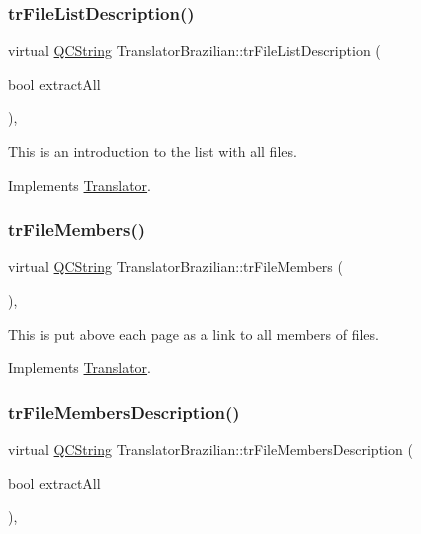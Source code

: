 \subsubsection{\texorpdfstring{trFileListDescription()}{trFileListDescription()}}
{\footnotesize\ttfamily virtual \mbox{\hyperlink{class_q_c_string}{Q\+C\+String}} Translator\+Brazilian\+::tr\+File\+List\+Description (\begin{DoxyParamCaption}\item[{bool}]{extract\+All }\end{DoxyParamCaption})\hspace{0.3cm}{\ttfamily [inline]}, {\ttfamily [virtual]}}

This is an introduction to the list with all files. 

Implements \mbox{\hyperlink{class_translator}{Translator}}.

\mbox{\label{class_translator_brazilian_aa024ffe399f6960172da02e87c4dd6f7}} 
\subsubsection{\texorpdfstring{trFileMembers()}{trFileMembers()}}
{\footnotesize\ttfamily virtual \mbox{\hyperlink{class_q_c_string}{Q\+C\+String}} Translator\+Brazilian\+::tr\+File\+Members (\begin{DoxyParamCaption}{ }\end{DoxyParamCaption})\hspace{0.3cm}{\ttfamily [inline]}, {\ttfamily [virtual]}}

This is put above each page as a link to all members of files. 

Implements \mbox{\hyperlink{class_translator}{Translator}}.

\mbox{\label{class_translator_brazilian_ae8055763a1567f6f2ab804b2c6e5712a}} 
\subsubsection{\texorpdfstring{trFileMembersDescription()}{trFileMembersDescription()}}
{\footnotesize\ttfamily virtual \mbox{\hyperlink{class_q_c_string}{Q\+C\+String}} Translator\+Brazilian\+::tr\+File\+Members\+Description (\begin{DoxyParamCaption}\item[{bool}]{extract\+All }\end{DoxyParamCaption})\hspace{0.3cm}{\ttfamily [inline]}, {\ttfamily [virtual]}}

